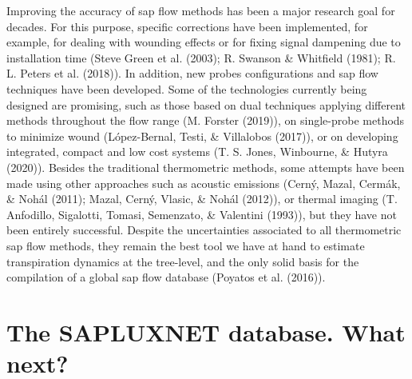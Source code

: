 \documentclass[11pt,twoside]{reedthesis}
\begin{document}
Improving the accuracy of sap flow methods has been a major research
goal for decades. For this purpose, specific corrections have been
implemented, for example, for dealing with wounding effects or for
fixing signal dampening due to installation time (Steve Green et al.
(2003); R. Swanson \& Whitfield (1981); R. L. Peters et al. (2018)). In
addition, new probes configurations and sap flow techniques have been
developed. Some of the technologies currently being designed are
promising, such as those based on dual techniques applying different
methods throughout the flow range (M. Forster (2019)), on single-probe
methods to minimize wound (López-Bernal, Testi, \& Villalobos (2017)),
or on developing integrated, compact and low cost systems (T. S. Jones,
Winbourne, \& Hutyra (2020)). Besides the traditional thermometric
methods, some attempts have been made using other approaches such as
acoustic emissions (Cerný, Mazal, Cermák, \& Nohál (2011); Mazal, Cerný,
Vlasic, \& Nohál (2012)), or thermal imaging (T. Anfodillo, Sigalotti,
Tomasi, Semenzato, \& Valentini (1993)), but they have not been entirely
successful. Despite the uncertainties associated to all thermometric sap
flow methods, they remain the best tool we have at hand to estimate
transpiration dynamics at the tree-level, and the only solid basis for
the compilation of a global sap flow database (Poyatos et al.
(2016)).\par

\section{The SAPLUXNET database. What
next?}\label{the-sapluxnet-database.-what-next}
\end{document}
